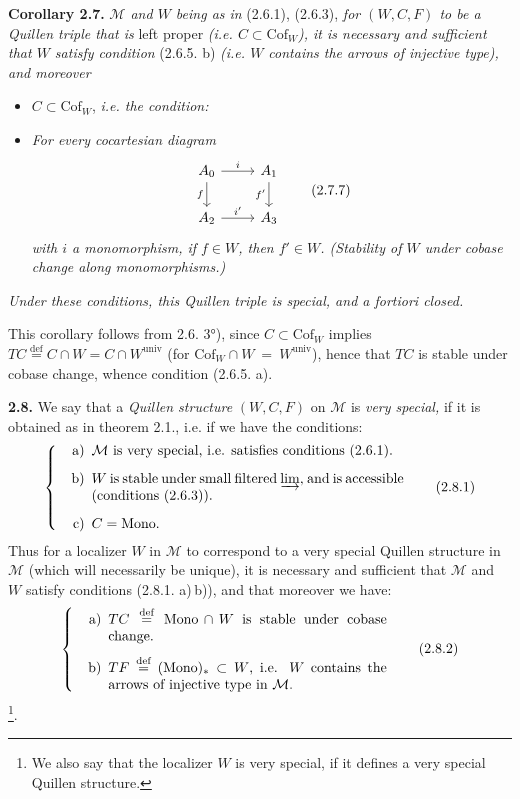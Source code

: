 \documentclass[11pt]{article}
\newcommand{\printedpage}[1]{\marginpar{\footnotesize p.~#1}}
\newcommand{\msp}[1]{\marginpar{\footnotesize [#1]}}
\newcommand{\deq}{\overset{\text{def}}{=}}
\newcommand{\Mono}{\mathrm{Mono}}
\newcommand{\Cof}{\mathrm{Cof}}
\begin{document}
\textbf{Corollary 2.7.} \textit{$\mathcal{M}$ and $W$ being as in} (2.6.1), (2.6.3), \textit{for $(W,C,F)$ to be a Quillen triple that is} left proper \textit{(i.e. $C \subset \Cof_W$), it is necessary and sufficient that $W$ satisfy condition} (2.6.5. b) \textit{(i.e. $W$ contains the arrows of injective type), and moreover}
\msp{page 27}

\begin{itemize}[leftmargin=7em]
\item[] $C \subset \Cof_W$, \textit{i.e. the condition:}
\item[a$'$)] \textit{For every cocartesian diagram}
\[ \begin{tikzcd}
A_0 \arrow[r, "i"] \arrow[d, "f"'] & A_1 \arrow[d, "f'"'] \\
A_2 \arrow[r, "i'"] & A_3
\end{tikzcd} \tag*{(2.7.7)} \]
\textit{with $i$ a monomorphism, if $f \in W$, then $f' \in W$. (Stability of $W$ under cobase change along monomorphisms.)}
\end{itemize}

\textit{Under these conditions, this Quillen triple is special, and a fortiori closed.}

This corollary follows from 2.6. 3°), since $C \subset \Cof_W$ implies $TC \deq C\cap W = C\cap W^{\mathrm{univ}}$ (for $\Cof_W \cap W \ = \ W^{\mathrm{univ}}$), hence that $TC$ is stable under cobase change, whence condition (2.6.5. a).

\printedpage{17}

\textbf{2.8.} We say that a \textit{Quillen structure} $(W,C,F)$ on $\mathcal{M}$ is \textit{very special,} if it is obtained as in theorem 2.1., i.e. if we have the conditions:
\[ \left\{ \begin{minipage}{0.72\textwidth}
\begin{itemize}[leftmargin=2.5em]
\item[a)] $\mathcal{M}$ is very special, i.e. satisfies conditions (2.6.1).
\item[b)] $W$ is stable under small filtered $\varinjlim$, and is accessible (conditions (2.6.3)).
\item[c)] $C = \Mono$.
\end{itemize}
\end{minipage}\right. \tag*{(2.8.1)} \]
Thus for a localizer $W$ in $\mathcal{M}$ to correspond to a very special Quillen structure \msp{page 28} in $\mathcal{M}$ (which will necessarily be unique), it is necessary and sufficient that $\mathcal{M}$ and $W$ satisfy conditions (2.8.1. a)\,b)), and that moreover we have:
\[ \left\{ \begin{minipage}{0.65\textwidth}
\begin{itemize}[leftmargin=2.5em]
\item[a)] $TC \deq \Mono\cap W$ is stable under cobase change.
\item[b)] $TF \deq (\Mono)_* \subset W$, i.e. $W$ contains the arrows of injective type in $\mathcal{M}$.
\end{itemize}
\end{minipage}\right. \tag*{(2.8.2)} \]
\footnote[16]{We also say that the localizer $W$ is very special, if it defines a very special Quillen structure.}.
\end{document}

